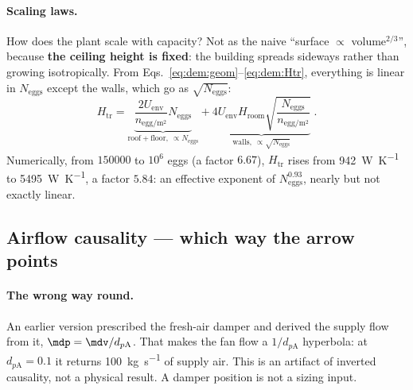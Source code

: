 \paragraph{Scaling laws.} How does the plant scale with capacity? Not as the
naive ``surface $\propto$ volume$^{2/3}$'', because \textbf{the ceiling height is
fixed}: the building spreads sideways rather than growing isotropically. From
Eqs.~\eqref{eq:dem:geom}--\eqref{eq:dem:Htr}, everything is linear in
$N_{\mathrm{eggs}}$ except the walls, which go as $\sqrt{N_{\mathrm{eggs}}}$:
\begin{equation}
H_{\mathrm{tr}}
=\underbrace{\frac{2U_{\mathrm{env}}}{n_{\mathrm{egg/m^2}}}N_{\mathrm{eggs}}}
_{\text{roof}+\text{floor},\ \propto N_{\mathrm{eggs}}}
+\underbrace{4U_{\mathrm{env}}H_{\mathrm{room}}
\sqrt{\frac{N_{\mathrm{eggs}}}{n_{\mathrm{egg/m^2}}}}}
_{\text{walls},\ \propto\sqrt{N_{\mathrm{eggs}}}}\;.
\label{eq:dem:scaling}
\end{equation}
Numerically, from $\num{150000}$ to $10^{6}$ eggs (a factor
$6.67$), $H_{\mathrm{tr}}$ rises from \SI{942}{\watt\per\kelvin} to
\SI{5495}{\watt\per\kelvin}, a factor $5.84$: an effective exponent of
$N_{\mathrm{eggs}}^{0.93}$, nearly but not exactly linear.

\begin{center}
\end{center}

\subsection{Airflow causality --- which way the arrow points}
\label{sec:dem:causality}

\paragraph{The wrong way round.} An earlier version prescribed the fresh-air
damper and derived the supply flow from it, $\mdp=\mdv/d_{p\mathrm{A}}$. That
makes the fan flow a $1/d_{p\mathrm{A}}$ hyperbola: at $d_{p\mathrm{A}}=0.1$ it
returns \SI{100}{\kilogram\per\second} of supply air. This is an artifact of
inverted causality, not a physical result. A damper position is not a sizing
input.

